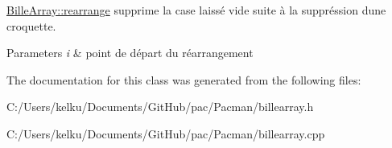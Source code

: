 \hyperlink{class_bille_array_a49fa7a7d7ad867c838205b490488c7a3}{Bille\+Array\+::rearrange} supprime la case laissé vide suite à la suppréssion d\textquotesingle{}une croquette. 


\begin{DoxyParams}{Parameters}
{\em i} & point de départ du réarrangement \\
\hline
\end{DoxyParams}


The documentation for this class was generated from the following files\+:\begin{DoxyCompactItemize}
\item 
C\+:/\+Users/kelku/\+Documents/\+Git\+Hub/pac/\+Pacman/billearray.\+h\item 
C\+:/\+Users/kelku/\+Documents/\+Git\+Hub/pac/\+Pacman/billearray.\+cpp\end{DoxyCompactItemize}
